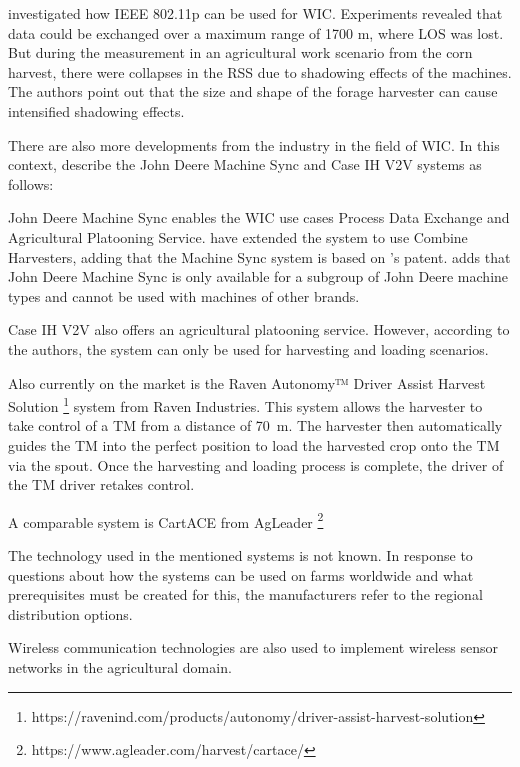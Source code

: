 \textcite{klingler_agriculture_2018} investigated how IEEE 802.11p can be used for \ac{WIC}. Experiments revealed
that data could be exchanged over a maximum range of 1700 m, where \ac{LOS} was lost. But during the
measurement in an agricultural work scenario from the corn harvest, there were collapses in the \ac{RSS}
due to shadowing effects of the machines. The authors point out that the size and shape of the forage harvester
can cause intensified shadowing effects.

There are also more developments from the industry in the field of \ac{WIC}. In this context, \textcite{thomasson_review_2018} describe the John Deere Machine Sync and Case IH V2V systems as follows:

John Deere Machine Sync enables the \ac{WIC} use cases Process Data Exchange and Agricultural Platooning Service. \textcite{liu_automation_2022} have extended the system to use Combine Harvesters, adding that the Machine Sync system is based on \textcite{metzler_system_2006}'s patent.
\textcite{smolnik_5g_2020} adds that John Deere Machine Sync is only available for a subgroup of John Deere machine types and cannot be used with machines of other brands.

Case IH V2V also offers an agricultural platooning service. However, according to the authors, the system can only be used for harvesting and loading scenarios.

Also currently on the market is the Raven Autonomy™ Driver Assist Harvest Solution \footnote{https://ravenind.com/products/autonomy/driver-assist-harvest-solution} system from Raven Industries. This system allows the harvester to take control of a \ac{TM} from a distance of \SI{70}{\metre}. The harvester then automatically guides the \ac{TM} into the perfect position to load the harvested crop onto the \ac{TM} via the spout. Once the harvesting and loading process is complete, the driver of the \ac{TM} driver retakes control.

A comparable system is CartACE from AgLeader \footnote{https://www.agleader.com/harvest/cartace/}

The technology used in the mentioned systems is not known. In response to questions about how the systems can be used on farms worldwide and what prerequisites must be created for this, the manufacturers refer to the regional distribution options.

Wireless communication technologies are also used to implement wireless sensor networks in the agricultural domain.

